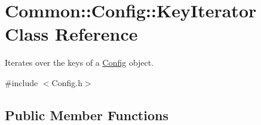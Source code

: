 \hypertarget{class_common_1_1_config_1_1_key_iterator}{\section{Common\-:\-:Config\-:\-:Key\-Iterator Class Reference}
\label{class_common_1_1_config_1_1_key_iterator}
}


Iterates over the keys of a \hyperlink{class_common_1_1_config}{Config} object.  




{\ttfamily \#include $<$Config.\-h$>$}

\subsection*{Public Member Functions}
